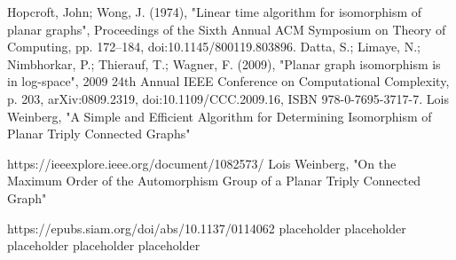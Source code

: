 \begin{thebibliography}{99}
     Hopcroft, John; Wong, J. (1974), 
    "Linear time algorithm for isomorphism of planar graphs", 
    Proceedings of the Sixth Annual ACM Symposium on Theory of Computing, 
    pp. 172–184, doi:10.1145/800119.803896.
     Datta, S.; Limaye, N.; Nimbhorkar, P.; Thierauf, T.; Wagner, F. (2009), 
    "Planar graph isomorphism is in log-space", 
    2009 24th Annual IEEE Conference on Computational Complexity, 
    p. 203, arXiv:0809.2319, doi:10.1109/CCC.2009.16, ISBN 978-0-7695-3717-7.
     Lois Weinberg,
    "A Simple and Efficient Algorithm for Determining Isomorphism  of Planar Triply Connected Graphs"
    
    https://ieeexplore.ieee.org/document/1082573/
     Lois Weinberg,
    "On the Maximum Order of the Automorphism Group of a Planar Triply Connected Graph"
    
    https://epubs.siam.org/doi/abs/10.1137/0114062
     placeholder
    \bibitem{} placeholder
    \bibitem{} placeholder
    \bibitem{} placeholder
    \bibitem{} placeholder
\end{thebibliography}